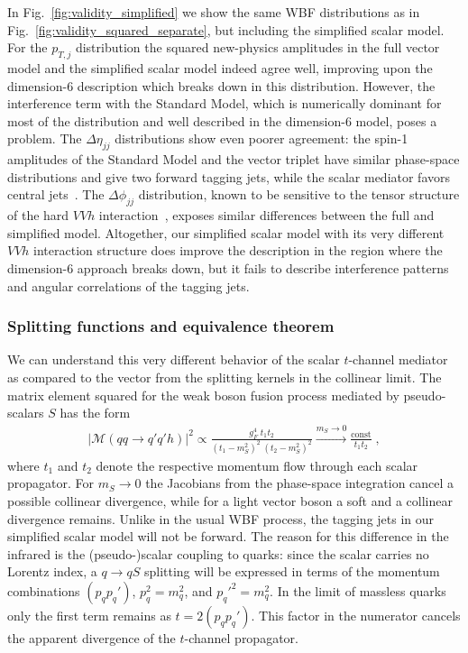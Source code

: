 In Fig.~\ref{fig:validity_simplified} we show the same WBF distributions as in
Fig.~\ref{fig:validity_squared_separate}, but including the simplified scalar
model. For the $p_{T,j}$ distribution the squared new-physics
amplitudes in the full vector model and the simplified scalar model
indeed agree well, improving upon the dimension-6 description which
breaks down in this distribution.  However, the interference term with
the Standard Model, which is numerically dominant for most of the
distribution and well described in the dimension-6 model, poses a
problem.  The $\Delta \eta_{jj}$ distributions show even poorer
agreement: the spin-1 amplitudes of the Standard Model and the vector
triplet have similar phase-space distributions and give two forward
tagging jets, while the scalar mediator favors central
jets~\cite{spins2}.  The $\Delta \phi_{jj}$ distribution, known to be
sensitive to the tensor structure of the hard $VVh$
interaction~\cite{delta_phi}, exposes similar differences between the
full and simplified model.  Altogether, our simplified scalar model
with its very different $VVh$ interaction structure does improve the
description in the region where the dimension-6 approach breaks down,
but it fails to describe interference patterns and angular
correlations of the tagging jets.



\subsubsection*{Splitting functions and equivalence theorem}

We can understand this very different behavior of the scalar
$t$-channel mediator as compared to the vector from the splitting
kernels in the collinear limit.  The matrix element squared for the
weak boson fusion process mediated by pseudo-scalars $S$ has the form
%
\begin{align}
 | \mathcal{M}(qq \to q'q'h) |^2 \propto 
  \frac{g_F^4 \;  t_1 t_2}{(t_1 - m_S^2)^2 \; (t_2 - m_S^2)^2} 
\stackrel{m_S \to 0}{\longrightarrow} \frac{\text{const}}{t_1 t_2} \; ,
\end{align}
%
where $t_1$ and $t_2$ denote the respective momentum flow through each
scalar propagator. For $m_S \to 0$ the Jacobians from the phase-space
integration cancel a possible collinear divergence, while for a light
vector boson a soft and a collinear divergence remains. Unlike in the
usual WBF process, the tagging jets in our simplified scalar model
will not be forward.  The reason for this difference in the
infrared is the (pseudo-)scalar coupling to quarks: since the scalar
carries no Lorentz index, a $q \to q S$ splitting will be expressed in
terms of the momentum combinations $(p_q p_q')$, $p_q^2 = m_q^2$, and
$p_q'^2 = m_q^2$. In the limit of massless quarks only the first term
remains as $t = 2 (p_q p_q')$.  This factor in the numerator cancels
the apparent divergence of the $t$-channel propagator.

